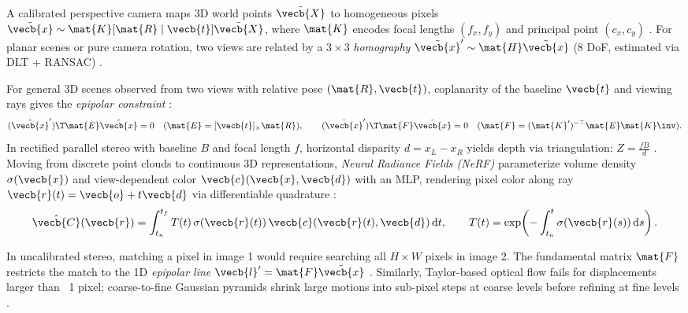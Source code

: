\documentclass[../../../../master.tex]{subfiles}
\begin{document}
\begin{coremath}
A calibrated perspective camera maps 3D world points $\tilde{\vecb{X}}$ to homogeneous pixels $\tilde{\vecb{x}} \sim \mat{K}[\mat{R} \mid \vecb{t}]\tilde{\vecb{X}}$, where $\mat{K}$ encodes focal lengths $(f_x, f_y)$ and principal point $(c_x, c_y)$ . For planar scenes or pure camera rotation, two views are related by a $3\times 3$ \emph{homography} $\tilde{\vecb{x}}' \sim \mat{H}\tilde{\vecb{x}}$ (8 DoF, estimated via DLT + RANSAC) .

For general 3D scenes observed from two views with relative pose $(\mat{R}, \vecb{t})$, coplanarity of the baseline $\vecb{t}$ and viewing rays gives the \emph{epipolar constraint} :
\begin{equation}
  (\hat{\vecb{x}}')\T \mat{E} \hat{\vecb{x}} = 0 \quad (\mat{E} = [\vecb{t}]_\times \mat{R}), \qquad (\tilde{\vecb{x}}')\T \mat{F} \tilde{\vecb{x}} = 0 \quad (\mat{F} = (\mat{K}')^{-\top}\mat{E}\mat{K}\inv).
\end{equation}
In rectified parallel stereo with baseline $B$ and focal length $f$, horizontal disparity $d = x_L - x_R$ yields depth via triangulation: $Z = \frac{f B}{d}$ . Moving from discrete point clouds to continuous 3D representations, \emph{Neural Radiance Fields (NeRF)} parameterize volume density $\sigma(\vecb{x})$ and view-dependent color $\vecb{c}(\vecb{x}, \vecb{d})$ with an MLP, rendering pixel color along ray $\vecb{r}(t)=\vecb{o}+t\vecb{d}$ via differentiable quadrature :
\begin{equation}
  \hat{\vecb{C}}(\vecb{r}) = \int_{t_n}^{t_f} T(t)\,\sigma(\vecb{r}(t))\,\vecb{c}(\vecb{r}(t),\vecb{d})\,\mathrm{d}t, \qquad T(t) = \exp\!\left(-\int_{t_n}^{t} \sigma(\vecb{r}(s))\,\mathrm{d}s\right).
\end{equation}
\end{coremath}

\begin{intuition}
In uncalibrated stereo, matching a pixel in image 1 would require searching all $H\times W$ pixels in image 2. The fundamental matrix $\mat{F}$ restricts the match to the 1D \emph{epipolar line} $\vecb{l}' = \mat{F}\tilde{\vecb{x}}$ . Similarly, Taylor-based optical flow fails for displacements larger than ~1 pixel; coarse-to-fine Gaussian pyramids shrink large motions into sub-pixel steps at coarse levels before refining at fine levels .
\end{intuition}
\end{document}
